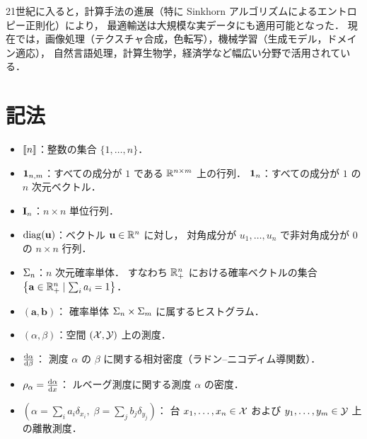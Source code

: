 21世紀に入ると，計算手法の進展（特に Sinkhorn アルゴリズムによるエントロピー正則化）により，
最適輸送は大規模な実データにも適用可能となった．
現在では，画像処理（テクスチャ合成，色転写），機械学習（生成モデル，ドメイン適応），
自然言語処理，計算生物学，経済学など幅広い分野で活用されている．

\section*{記法}
\label{sec:notation}

\begin{itemize}
  \item $\llbracket n \rrbracket$：整数の集合 $\{1, \ldots, n\}$．

  \item $\mathbf{1}_{n,m}$：すべての成分が $1$ である $\mathbb{R}^{n \times m}$ 上の行列．
    $\mathbf{1}_n$：すべての成分が $1$ の $n$ 次元ベクトル．

  \item $\mathbf{I}_n$：$n \times n$ 単位行列．

  \item $\operatorname{diag}(\mathbf{u})$：ベクトル $\mathbf{u} \in \mathbb{R}^n$ に対し，
    対角成分が $u_1, \ldots, u_n$ で非対角成分が $0$ の $n \times n$ 行列．

  \item $\Sigma_n$：$n$ 次元確率単体．
    すなわち $\mathbb{R}_+^n$ における確率ベクトルの集合
    $\left\{ \mathbf{a} \in \mathbb{R}_+^n \mid \sum_i a_i = 1 \right\}$．

  \item $(\mathbf{a}, \mathbf{b})$：
    確率単体 $\Sigma_n \times \Sigma_m$ に属するヒストグラム．

  \item $(\alpha, \beta)$：空間 $(\mathcal{X}, \mathcal{Y})$ 上の測度．

  \item $\frac{\mathrm{d}\alpha}{\mathrm{d}\beta}$：
    測度 $\alpha$ の $\beta$ に関する相対密度（ラドン--ニコディム導関数）．

  \item $\rho_\alpha = \frac{\mathrm{d}\alpha}{\mathrm{d} x}$：
    ルベーグ測度に関する測度 $\alpha$ の密度．

  \item $\left(\alpha = \sum_i a_i \delta_{x_i},\;
    \beta = \sum_j b_j \delta_{y_j}\right)$：
    台 $x_1, \ldots, x_n \in \mathcal{X}$ および $y_1, \ldots, y_m \in \mathcal{Y}$ 上の離散測度．


\end{itemize}
